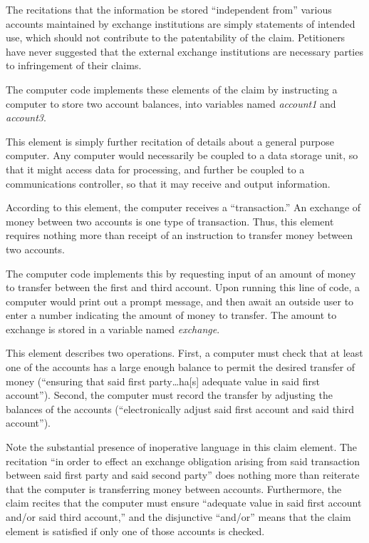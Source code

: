 \documentclass{scotus}
\begin{document}
The recitations that the information be stored ``independent from'' various
accounts maintained by exchange institutions are simply statements of intended
use, which should not contribute to the patentability of the claim. Petitioners
have never suggested that the external exchange institutions are necessary
parties to infringement of their claims.

The computer code implements these elements of the claim by instructing a
computer to store two account balances, into variables named \emph{account1} and
\emph{account3}.


This element is simply further recitation of details about a general purpose
computer. Any computer would necessarily be coupled to a data storage unit, so
that it might access data for processing, and further be coupled to a
communications controller, so that it may receive and output information.


According to this element, the computer receives a ``transaction.'' An exchange
of money between two accounts is one type of transaction. Thus, this element
requires nothing more than receipt of an instruction to transfer money between
two accounts.

The computer code implements this by requesting input of an amount of money to
transfer between the first and third account. Upon running this line of code,
a computer would print out a prompt message, and then await an outside user to
enter a number indicating the amount of money to transfer. The amount to
exchange is stored in a variable named \emph{exchange}.


This element describes two operations. First, a computer must check that at
least one of the accounts has a large enough balance to permit the desired
transfer of money (``ensuring that said first party\ldots ha[s] adequate value
in
said first account''). Second, the computer must record the transfer by
adjusting the balances of the accounts (``electronically adjust said first
account and said third account'').

Note the substantial presence of inoperative language in this claim element. The
recitation ``in order to effect an exchange obligation arising from said
transaction between said first party and said second party'' does nothing more
than reiterate that the computer is transferring money between accounts.
Furthermore, the claim recites that the computer must ensure ``adequate value in
said first account and/or said third account,'' and the disjunctive ``and/or''
means that the claim element is satisfied if only one of those accounts is
checked.
\end{document}
